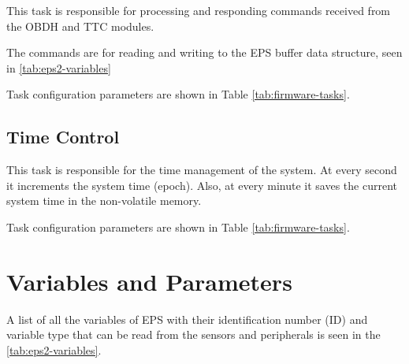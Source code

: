 This task is responsible for processing and responding commands received from the OBDH and TTC modules.

The commands are for reading and writing to the EPS buffer data structure, seen in \autoref{tab:eps2-variables}

Task configuration parameters are shown in Table \ref{tab:firmware-tasks}.

\subsection{Time Control}

This task is responsible for the time management of the system.
At every second it increments the system time (epoch).
Also, at every minute it saves the current system time in the non-volatile memory.

Task configuration parameters are shown in Table \ref{tab:firmware-tasks}.





\section{Variables and Parameters}

A list of all the variables of EPS with their identification number (ID) and variable type that can be read from the sensors and peripherals is seen in the \autoref{tab:eps2-variables}.

